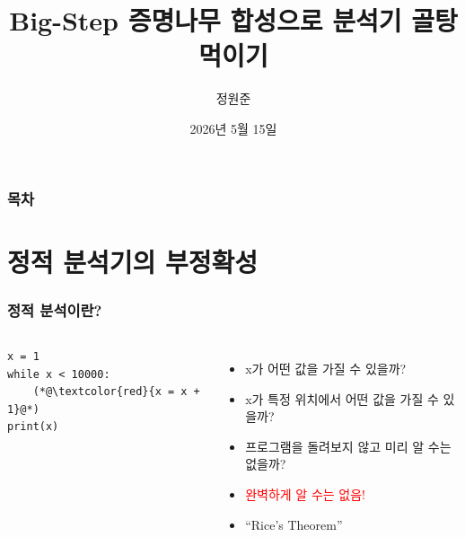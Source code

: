 \documentclass{simplesnt}
\title{Big-Step 증명나무 합성으로 분석기 골탕먹이기}
\author{정원준}
\begin{document}
\date{2026년 5월 15일}
\maketitle


\begin{frame}
  \frametitle{목차}
  \tableofcontents
\end{frame}



\section{정적 분석기의 부정확성}
\begin{frame}[c, fragile]
  \frametitle{정적 분석이란?}

  \setlength{\columnsep}{16pt}

  \begin{columns}[T,onlytextwidth]
    \hfill
    \begin{minipage}{0.78\linewidth}
    \begin{lstlisting}
x = 1
while x < 10000:
    (*@\textcolor{red}{x = x + 1}@*)
print(x)
    \end{lstlisting}
    \end{minipage}

    \vspace{8pt}
    \begin{itemize}
      \item<2-> x가 어떤 값을 가질 수 있을까?
      \item<3-> x가 특정 위치에서 어떤 값을 가질 수 있을까?
      \item<4-> 프로그램을 돌려보지 않고 미리 알 수는 없을까?
      \item<5-> \textcolor{red}{완벽하게 알 수는 없음!}
      \item<6-> ``Rice's Theorem''
    \end{itemize}
  \end{columns}

\end{frame}
\end{document}
